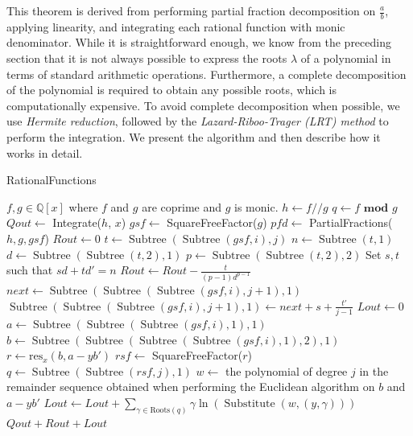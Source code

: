 \documentclass{article}
\theoremstyle{definition}
\DeclareMathOperator{\subs}{Substitute}
\DeclareMathOperator{\subtree}{Subtree}
\DeclareMathOperator{\args}{Args}
\begin{document}
This theorem is derived from performing partial fraction decomposition on $\frac{a}{b}$, applying linearity, and integrating each rational function with monic denominator. While it is straightforward enough, we know from the preceding section that it is not always possible to express the roots $\lambda$ of a polynomial in terms of standard arithmetic operations. Furthermore, a complete decomposition of the polynomial is required to obtain any possible roots, which is computationally expensive. To avoid complete decomposition when possible, we use \emph{Hermite reduction}, followed by the \emph{Lazard-Riboo-Trager (LRT) method} to perform the integration. We present the algorithm and then describe how it works in detail.

{\footnotesize
\begin{algorithm}\small
\caption{RationalFunctions \cite{lrt}}
    \begin{algorithmic}[1]
        \Require $f, g \in \mathbb{Q}[x]$ where $f$ and $g$ are coprime and $g$ is monic.
        \State $h \gets f // g$
        \State $q \gets f \textbf{ mod } g$
        \State $Qout \gets $ Integrate($h$, $x$)
        \State $gsf \gets $ SquareFreeFactor($g$)
        \State $pfd \gets$ PartialFractions($h, g, gsf$)
        \State $Rout \gets 0$
        \For{$i \in \{2, \ldots, \args(rsf)\}$}
                \State $t \gets \subtree(\subtree(gsf, i), j)$
                \State $n \gets \subtree(t, 1)$
                \State $d \gets \subtree(\subtree(t, 2), 1)$
                \State $p \gets \subtree(\subtree(t, 2), 2)$
                \State Set $s, t$ such that $sd+td' = n$
                \State $Rout \gets Rout - \frac{t}{(p-1)d^{p-1}}$
                \State $next \gets \subtree(\subtree(\subtree(gsf, i), j+1), 1) $
                \State $\subtree(\subtree(\subtree(gsf, i), j+1), 1) \gets next +s+\frac{t'}{j-1}$
            \EndFor
        \EndFor
        \State $Lout \gets 0$
        \For{$i \in \{1, \ldots, \args(rsf)\}$}
            \State $a \gets \subtree(\subtree(\subtree(gsf, i), 1), 1)$
            \State $b \gets \subtree(\subtree(\subtree(\subtree(gsf, i), 1), 2), 1)$
            \State $r \gets \mathrm{res}_x(b, a-yb')$
            \State $rsf \gets $ SquareFreeFactor($r$)
            \For{$j \in \{1,\ldots,\args(rsf) \}$}
                \State $q \gets \subtree(\subtree(rsf, j), 1)$
                    $w \gets $ the polynomial of degree $j$ in the remainder sequence obtained when performing the Euclidean algorithm on $b$ and $a-yb'$
                    \State $Lout \gets Lout + \sum_{\gamma  \in \mathrm{Roots}(q)} \gamma \ln(\subs(w, (y, \gamma)))$
                \EndIf
            \EndFor
        \EndFor
        \State \Return $Qout + Rout + Lout$
    \end{algorithmic}
\end{algorithm}
}
\newpage
\end{document}
